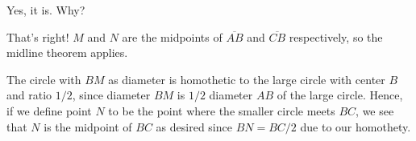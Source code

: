 
Yes, it is. Why?





That's right! $M$ and $N$ are the midpoints of $\overline{AB}$ and $\overline{CB}$ respectively, so the midline theorem applies.






The circle with $BM$ as diameter is homothetic to the large circle with center $B$ and ratio $1/2$, since diameter $BM$ is $1/2$ diameter $AB$ of the large circle. Hence, if we define point $N$ to be the point where the smaller circle meets $BC$, we see that $N$ is the midpoint of $BC$ as desired since $BN = BC/2$ due to our homothety.





